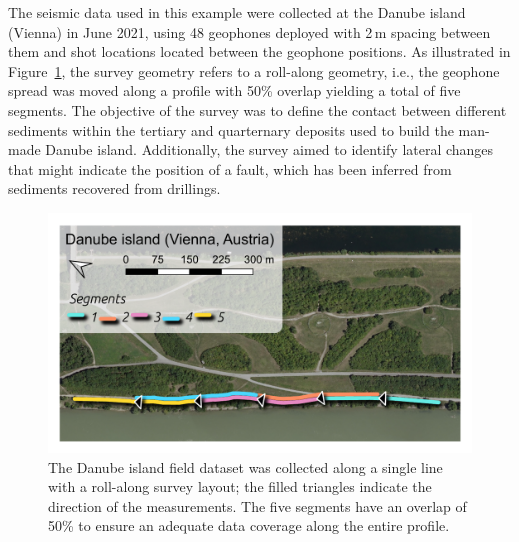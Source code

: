 \documentclass[a4paper,fleqn]{cas-sc}
\begin{document}
The seismic data used in this example were collected at the Danube island (Vienna) in June 2021, using 48 geophones deployed with 2\,m spacing between them and shot locations located between the geophone positions. As illustrated in Figure~\ref{fig:map_danube}, the survey geometry refers to a roll-along geometry, i.e., the geophone spread was moved along a profile with 50\% overlap yielding a total of five segments. The objective of the survey was to define the contact between different sediments within the tertiary and quarternary deposits used to build the man-made Danube island. Additionally, the survey aimed to identify lateral changes that might indicate the position of a fault, which has been inferred from sediments recovered from drillings. 
\begin{figure}
	\centering
	\includegraphics[width=.75\textwidth]{./figures/map_danube.pdf}
	\caption{The Danube island field dataset was collected along a single line with a roll-along survey layout; the filled triangles indicate the direction of the measurements. The five segments have an overlap of 50\% to ensure an adequate data coverage along the entire profile.}
	\label{fig:map_danube}
\end{figure}
\end{document}
